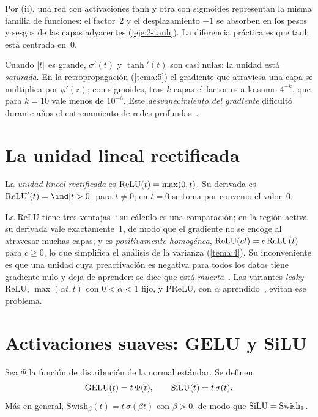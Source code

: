 Por (ii), una red con activaciones tanh y otra con sigmoides representan la misma familia de funciones: el factor~2 y el desplazamiento $-1$ se absorben en los pesos y sesgos de las capas adyacentes (\cref{eje:2-tanh}). La diferencia práctica es que tanh está centrada en~0.

\begin{observacion}\label{obs:desvanecimiento}
Cuando $\lvert t\rvert$ es grande, $\sigma'(t)$ y $\tanh'(t)$ son casi nulas: la unidad está \emph{saturada}. En la retropropagación (\cref{tema:5}) el gradiente que atraviesa una capa se multiplica por $\phi'(z)$; con sigmoides, tras $k$ capas el factor es a lo sumo $4^{-k}$, que para $k=10$ vale menos de $10^{-6}$. Este \emph{desvanecimiento del gradiente} dificultó durante años el entrenamiento de redes profundas~\cite[§6.3.2]{gbc}.
\end{observacion}

\section{La unidad lineal rectificada}

\begin{definicion}[ReLU]
La \emph{unidad lineal rectificada} es $\operatorname{ReLU}(t)=\max(0,t)$. Su derivada es $\ReLU'(t)=\ind[t>0]$ para $t\neq 0$; en $t=0$ se toma por convenio el valor~0.
\end{definicion}

La ReLU tiene tres ventajas~\cite[§6.3.1]{gbc}: su cálculo es una comparación; en la región activa su derivada vale exactamente~1, de modo que el gradiente no se encoge al atravesar muchas capas; y es \emph{positivamente homogénea}, $\operatorname{ReLU}(ct)=c\operatorname{ReLU}(t)$ para $c\ge 0$, lo que simplifica el análisis de la varianza (\cref{tema:4}). Su inconveniente es que una unidad cuya preactivación es negativa para todos los datos tiene gradiente nulo y deja de aprender: se dice que está \emph{muerta}~\cite{cs231n}. Las variantes \emph{leaky} ReLU, $\max(\alpha t,t)$ con $0<\alpha<1$ fijo, y PReLU, con $\alpha$ aprendido~\cite{he}, evitan ese problema.

\section{Activaciones suaves: GELU y SiLU}

\begin{definicion}\label{def:gelu}
Sea $\Phi$ la función de distribución de la normal estándar. Se definen
\[
\operatorname{GELU}(t)=t\,\Phi(t),\qquad \operatorname{SiLU}(t)=t\,\sigma(t).
\]
Más en general, $\mathrm{Swish}_\beta(t)=t\,\sigma(\beta t)$ con $\beta>0$, de modo que $\operatorname{SiLU}=\mathrm{Swish}_1$.
\end{definicion}

